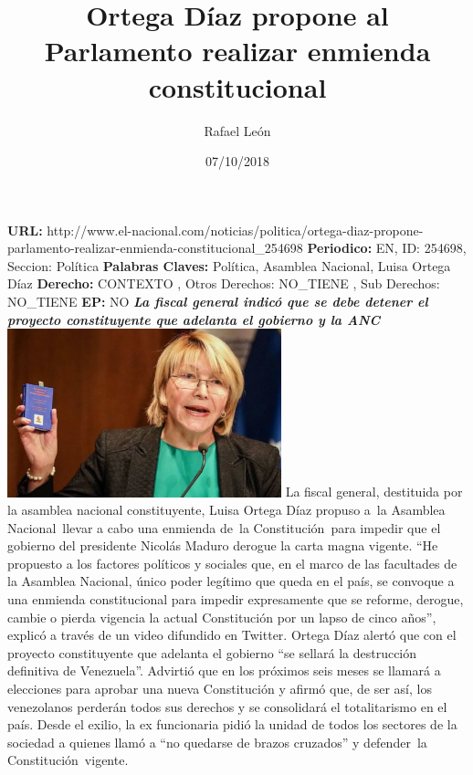 \documentclass{article}%
\title{\textbf{Ortega Díaz propone al Parlamento realizar enmienda constitucional}}%
\author{Rafael León}%
\date{07/10/2018}%
\begin{document}
%
\normalsize%
\maketitle%
\textbf{URL: }%
http://www.el{-}nacional.com/noticias/politica/ortega{-}diaz{-}propone{-}parlamento{-}realizar{-}enmienda{-}constitucional\_254698\newline%
%
\textbf{Periodico: }%
EN, %
ID: %
254698, %
Seccion: %
Política\newline%
%
\textbf{Palabras Claves: }%
Política, Asamblea Nacional, Luisa Ortega Díaz\newline%
%
\textbf{Derecho: }%
CONTEXTO%
, Otros Derechos: %
NO\_TIENE%
, Sub Derechos: %
NO\_TIENE%
\newline%
%
\textbf{EP: }%
NO\newline%
\newline%
%
\textbf{\textit{La fiscal general indicó que se debe detener el proyecto constituyente que adelanta el gobierno y la ANC}}%
\newline%
\newline%
%
\includegraphics[width=300px]{17.jpg}%
\newline%
%
La fiscal general, destituida por la asamblea nacional constituyente, Luisa Ortega Díaz propuso a~la Asamblea Nacional~llevar a cabo una enmienda de~la Constitución~para impedir que el gobierno del presidente Nicolás Maduro derogue la carta magna vigente.%
\newline%
%
“He propuesto a los factores políticos y sociales que, en el marco de las facultades de la Asamblea Nacional, único poder legítimo que queda en el país, se convoque a una enmienda constitucional para impedir expresamente que se reforme, derogue, cambie o pierda vigencia la actual Constitución por un lapso de cinco años”, explicó a través de un video difundido en Twitter.%
\newline%
%
Ortega Díaz alertó que con el proyecto constituyente que adelanta el gobierno “se sellará la destrucción definitiva de Venezuela”. Advirtió que en los próximos seis meses se llamará a elecciones para aprobar una nueva Constitución y afirmó que, de ser así, los venezolanos perderán todos sus derechos y se consolidará el totalitarismo en el país.%
\newline%
%
Desde el exilio, la ex funcionaria pidió la unidad de todos los sectores de la sociedad a quienes llamó a “no quedarse de brazos cruzados” y defender~la Constitución~vigente.%
\newline%
%
\end{document}
